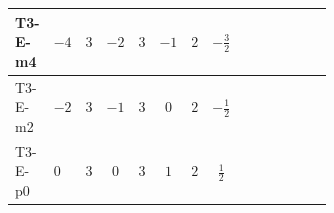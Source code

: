 \documentclass[8pt]{article}
\begin{document}
\begin{landscape}
\begin{longtable}{@{}llcccccc >{\raggedright\arraybackslash}p{0.21\linewidth} >{\raggedright\arraybackslash}p{0.21\linewidth} >{\raggedright\arraybackslash}p{0.21\linewidth}@{}}
\midrule
T3-E-m4 & $-4$ & $3$ & $-2$ & $3$ & $-1$ & $2$ & $-\frac{3}{2}$ & \scriptsize\adjustbox{max width=\linewidth}{$\begin{gathered} {\lambda_{S_1}^{(1)}} \left(\frac{1}{2} T_{\nu}^{(1)}+13 {\lambda_{S_1}^{(A)}}\right)\end{gathered}$} & \scriptsize\adjustbox{max width=\linewidth}{$\begin{gathered} +4 {\lambda_{S_1}^{(A)}} T_{\nu}^{(1)}\end{gathered}$} & \scriptsize\adjustbox{max width=\linewidth}{$\begin{gathered} -\operatorname{Tr}\!\left({y_1}\,\left({y_1}\right)^{\dagger}\,{y_1}\,\left({y_1}\right)^{\dagger}\right)\end{gathered}$} \\
\midrule
T3-E-m2 & $-2$ & $3$ & $-1$ & $3$ & $0$ & $2$ & $-\frac{1}{2}$ & \scriptsize\adjustbox{max width=\linewidth}{$\begin{gathered} {\lambda_{S_1}^{(1)}} \left(\frac{1}{2} T_{\nu}^{(1)}+13 {\lambda_{S_1}^{(A)}}\right)\end{gathered}$} & \scriptsize\adjustbox{max width=\linewidth}{$\begin{gathered} +4 {\lambda_{S_1}^{(A)}} T_{\nu}^{(1)}\end{gathered}$} & \scriptsize\adjustbox{max width=\linewidth}{$\begin{gathered} -\operatorname{Tr}\!\left({y_1}\,\left({y_1}\right)^{\dagger}\,{y_1}\,\left({y_1}\right)^{\dagger}\right)\end{gathered}$} \\
\midrule
T3-E-p0 & $0$ & $3$ & $0$ & $3$ & $1$ & $2$ & $\frac{1}{2}$ & \scriptsize\adjustbox{max width=\linewidth}{$\begin{gathered} {\lambda_{S_1}^{(1)}} \left(\frac{1}{2} T_{\nu}^{(1)}+13 {\lambda_{S_1}^{(A)}}\right)\end{gathered}$} & \scriptsize\adjustbox{max width=\linewidth}{$\begin{gathered} +4 {\lambda_{S_1}^{(A)}} T_{\nu}^{(1)}\end{gathered}$} & \scriptsize\adjustbox{max width=\linewidth}{$\begin{gathered} -\operatorname{Tr}\!\left({y_1}\,\left({y_1}\right)^{\dagger}\,{y_1}\,\left({y_1}\right)^{\dagger}\right)\end{gathered}$} \\
\midrule

\end{longtable}
\end{landscape}
\end{document}
